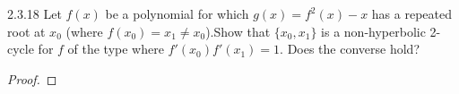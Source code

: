 \begin{problem}{2.3.18}
  Let $f(x)$ be a polynomial for which $g(x) = f^2(x) - x$ has a repeated root
  at $x_0$ (where $f(x_0) = x_1 \neq x_0$).Show that
  $\{x_0, x_1\}$ is a non-hyperbolic 2-cycle for $f$ of the type where $f'(x_0)f'(x_1) = 1$. Does
  the converse hold?
\end{problem}

\begin{proof}
\end{proof}
\newpage
